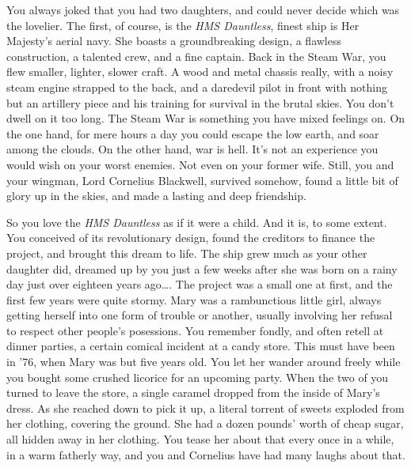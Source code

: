 \documentclass[char]{guildcamp1}
\begin{document}
\name{\cCaptain{}}


You always joked that you had two daughters, and could never decide
which was the lovelier. The first, of course, is the {\it HMS
Dauntless}, finest ship is Her Majesty's aerial navy. She boasts a
groundbreaking design, a flawless construction, a talented crew, and a
fine captain. Back in the Steam War, you flew smaller, lighter, slower
craft. A wood and metal chassis really, with a noisy steam engine
strapped to the back, and a daredevil pilot in front with nothing but
an artillery piece and his training for survival in the brutal
skies. You don't dwell on it too long. The Steam War is something you
have mixed feelings on. On the one hand, for mere hours a day you
could escape the low earth, and soar among the clouds. On the other
hand, war is hell. It's not an experience you would wish on your worst
enemies. Not even on your former wife. Still, you and your wingman,
Lord Cornelius Blackwell, survived somehow, found a little bit of
glory up in the skies, and made a lasting and deep friendship.

So you love the {\it HMS Dauntless} as if it were a child. And it is,
to some extent. You conceived of its revolutionary design, found the
creditors to finance the project, and brought this dream to life. The
ship grew much as your other daughter did, dreamed up by you just a
few weeks after she was born on a rainy day just over eighteen years
ago{\ldots}. The project was a small one at first, and the first few
years were quite stormy. Mary was a rambunctious little girl, always
getting herself into one form of trouble or another, usually involving
her refusal to respect other people's posessions. You remember fondly,
and often retell at dinner parties, a certain comical incident at a
candy store. This must have been in '76, when Mary was but five years
old. You let her wander around freely while you bought some crushed
licorice for an upcoming party. When the two of you turned to leave
the store, a single caramel dropped from the inside of Mary's
dress. As she reached down to pick it up, a literal torrent of sweets
exploded from her clothing, covering the ground. She had a dozen
pounds' worth of cheap sugar, all hidden away in her clothing. You
tease her about that every once in a while, in a warm fatherly way,
and you and Cornelius have had many laughs about that.
\end{document}
